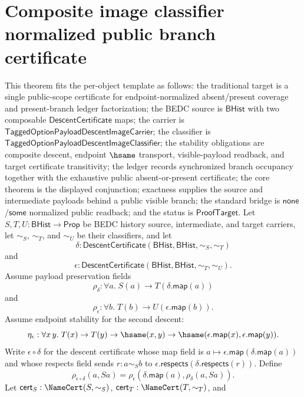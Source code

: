 \section{Composite image classifier normalized public branch certificate}
\label{sec:option-composite-image-classifier-normalized-public-branch-certificate}
\begin{theorem}
\label{thm:tagged-option-composite-image-classifier-normalized-public-branch-certificate}
This theorem fits the per-object template as follows: the traditional target is
a single public-scope certificate for endpoint-normalized absent/present
coverage and present-branch ledger factorization; the BEDC source is
$\mathsf{BHist}$ with two composable $\mathsf{DescentCertificate}$ maps; the
carrier is $\mathsf{TaggedOptionPayloadDescentImageCarrier}$; the classifier is
$\mathsf{TaggedOptionPayloadDescentImageClassifier}$; the stability obligations
are composite descent, endpoint $\hsame$ transport, visible-payload readback,
and target certificate transitivity; the ledger records synchronized branch
occupancy together with the exhaustive public absent-or-present certificate; the
core theorem is the displayed conjunction; exactness supplies the source and
intermediate payloads behind a public visible branch; the standard bridge is
$\mathsf{none}$/$\mathsf{some}$ normalized public readback; and the status is
$\mathsf{ProofTarget}$.
Let $S,T,U:\mathsf{BHist}\to\mathsf{Prop}$ be BEDC history source,
intermediate, and target carriers, let $\sim_S$, $\sim_T$, and $\sim_U$ be their
classifiers, and let
$$
\delta:\mathsf{DescentCertificate}(\mathsf{BHist},\mathsf{BHist},\sim_S,\sim_T)
$$
and
$$
\epsilon:\mathsf{DescentCertificate}(\mathsf{BHist},\mathsf{BHist},\sim_T,\sim_U).
$$
Assume payload preservation fields
$$
\rho_{\delta}:\forall a.\;S(a)\to T(\delta.\mathsf{map}(a))
$$
and
$$
\rho_{\epsilon}:\forall b.\;T(b)\to U(\epsilon.\mathsf{map}(b)).
$$
Assume endpoint stability for the second descent:
$$
\eta_{\epsilon}:\forall x\,y.\;
T(x)\to T(y)\to \hsame(x,y)\to
\hsame(\epsilon.\mathsf{map}(x),\epsilon.\mathsf{map}(y)).
$$
Write $\epsilon\circ\delta$ for the descent certificate whose map field is
$a\mapsto\epsilon.\mathsf{map}(\delta.\mathsf{map}(a))$ and whose respects field
sends $r:a\sim_S b$ to
$\epsilon.\mathsf{respects}(\delta.\mathsf{respects}(r))$. Define
$$
\rho_{\epsilon\circ\delta}(a,Sa)=
\rho_{\epsilon}(\delta.\mathsf{map}(a),\rho_{\delta}(a,Sa)).
$$
Let $\mathsf{cert}_S:\NameCert(S,\sim_S)$,
$\mathsf{cert}_T:\NameCert(T,\sim_T)$, and

\end{theorem}
